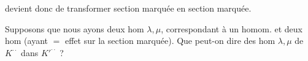 devient donc de transformer section marquée en section marquée.

Supposons que nous ayons deux hom $\lambda,\mu$, correspondant à un \uuline{$=$} homom.
et deux hom
(ayant $=$ effet sur la section marquée).
Que peut-on dire des hom $\lambda,\mu$ de $K^{\cdot\cdot}$ dans $K'^{\cdot\cdot}$ ?

